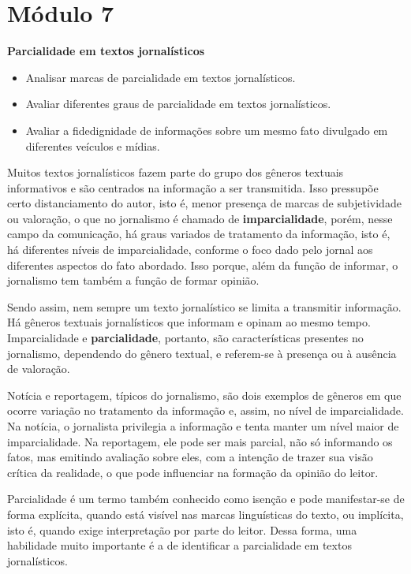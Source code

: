 \hypertarget{muxf3dulo-7}{%
\section{Módulo 7}\label{muxf3dulo-7}}

\textbf{Parcialidade em textos jornalísticos}


\begin{itemize}
\tightlist
\item
  Analisar marcas de parcialidade em textos jornalísticos.
\item
  Avaliar diferentes graus de parcialidade em textos jornalísticos.
\item
  Avaliar a fidedignidade de informações sobre um mesmo fato divulgado
  em diferentes veículos e mídias.
\end{itemize}

Muitos textos jornalísticos fazem parte do grupo dos gêneros textuais
informativos e são centrados na informação a ser transmitida. Isso
pressupõe certo distanciamento do autor, isto é, menor presença de
marcas de subjetividade ou valoração, o que no jornalismo é chamado de
\textbf{imparcialidade}, porém, nesse campo da comunicação, há graus
variados de tratamento da informação, isto é, há diferentes níveis de
imparcialidade, conforme o foco dado pelo jornal aos diferentes aspectos
do fato abordado. Isso porque, além da função de informar, o jornalismo
tem também a função de formar opinião.

Sendo assim, nem sempre um texto jornalístico se limita a transmitir
informação. Há gêneros textuais jornalísticos que informam e opinam ao
mesmo tempo. Imparcialidade e \textbf{parcialidade}, portanto, são
características presentes no jornalismo, dependendo do gênero textual, e
referem-se à presença ou à ausência de valoração.

Notícia e reportagem, típicos do jornalismo, são dois exemplos de
gêneros em que ocorre variação no tratamento da informação e, assim, no
nível de imparcialidade. Na notícia, o jornalista privilegia a
informação e tenta manter um nível maior de imparcialidade. Na
reportagem, ele pode ser mais parcial, não só informando os fatos, mas
emitindo avaliação sobre eles, com a intenção de trazer sua visão
crítica da realidade, o que pode influenciar na formação da opinião do
leitor.

Parcialidade é um termo também conhecido como isenção e pode
manifestar-se de forma explícita, quando está visível nas marcas
linguísticas do texto, ou implícita, isto é, quando exige interpretação
por parte do leitor. Dessa forma, uma habilidade muito importante é a de
identificar a parcialidade em textos jornalísticos.

